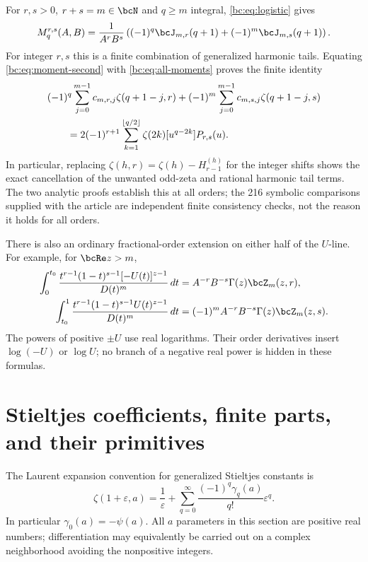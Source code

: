 For $r,s>0$, $r+s=m\in\bcN$ and $q\ge m$ integral,
\eqref{bc:eq:logistic} gives
\begin{equation}\label{bc:eq:moment-second}
 M_q^{r,s}(A,B)=\frac1{A^rB^s}
    \left((-1)^q\bcJ_{m,r}(q+1)+(-1)^m\bcJ_{m,s}(q+1)\right).
\end{equation}
For integer $r,s$ this is a finite combination of generalized harmonic
tails. Equating \eqref{bc:eq:moment-second} with
\eqref{bc:eq:all-moments} proves the finite identity
\begin{align}
 &(-1)^q\sum_{j=0}^{m-1}c_{m,r,j}\zeta(q+1-j,r)
  +(-1)^m\sum_{j=0}^{m-1}c_{m,s,j}\zeta(q+1-j,s)\notag\\
 &\qquad=2(-1)^{r+1}
     \sum_{k=1}^{\lfloor q/2\rfloor}
                   \zeta(2k)[u^{q-2k}]P_{r,s}(u).
 \label{bc:eq:hurwitz-cancellation}
\end{align}
In particular, replacing
$\zeta(h,r)=\zeta(h)-H_{r-1}^{(h)}$ for the integer shifts shows the
exact cancellation of the unwanted odd-zeta and rational harmonic
tail terms. The two analytic proofs establish this at all orders; the
216 symbolic comparisons supplied with the article are independent
finite consistency checks, not the reason it holds for all orders.

There is also an ordinary fractional-order extension on either half
of the $U$-line. For example, for $\bcRe z>m$,
\begin{align}
 \int_0^{t_0}\frac{t^{r-1}(1-t)^{s-1}[-U(t)]^{z-1}}
                        {D(t)^m}\,dt
       &=A^{-r}B^{-s}\Gamma(z)\bcZ_m(z,r),\notag\\
 \int_{t_0}^{1}\frac{t^{r-1}(1-t)^{s-1}U(t)^{z-1}}
                        {D(t)^m}\,dt
       &=(-1)^mA^{-r}B^{-s}\Gamma(z)\bcZ_m(z,s).
 \label{bc:eq:half-Mellin}
\end{align}
The powers of positive $\pm U$ use real logarithms. Their order
derivatives insert $\log(-U)$ or $\log U$; no branch of a negative
real power is hidden in these formulas.

\section{Stieltjes coefficients, finite parts, and their primitives}
\label{bc:sec:stieltjes}

The Laurent expansion convention for generalized Stieltjes constants is
\begin{equation}\label{bc:eq:stieltjes-convention}
 \zeta(1+\varepsilon,a)=\frac1\varepsilon+
     \sum_{q=0}^\infty\frac{(-1)^q\gamma_q(a)}{q!}\varepsilon^q.
\end{equation}
In particular $\gamma_0(a)=-\psi(a)$. All $a$ parameters in this section
are positive real numbers; differentiation may equivalently be carried
out on a complex neighborhood avoiding the nonpositive integers.

